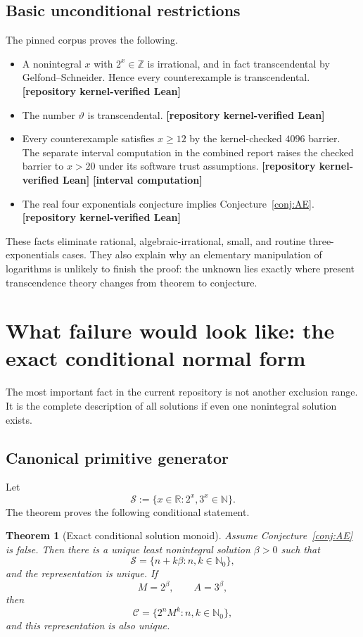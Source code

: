 \documentclass[11pt,oneside]{article}
\newtheorem{theorem}{Theorem}[section]
\theoremstyle{definition}
\theoremstyle{remark}
\newcommand{\N}{\mathbb N}
\newcommand{\Nzero}{\mathbb N_0}
\newcommand{\Z}{\mathbb Z}
\newcommand{\R}{\mathbb R}
\newcommand{\thetaq}{\vartheta}
\newcommand{\Sol}{\mathcal S}
\newcommand{\Cand}{\mathcal C}
\newcommand{\statuslean}{\textcolor{leanblue}{\textbf{[repository kernel-verified Lean]}}}
\newcommand{\statuscomp}{\textcolor{computeviolet}{\textbf{[interval computation]}}}
\begin{document}
\subsection{Basic unconditional restrictions}

The pinned corpus proves the following.

\begin{itemize}
\item A nonintegral $x$ with $2^x\in\Z$ is irrational, and in fact transcendental by
Gelfond--Schneider.  Hence every counterexample is transcendental.  \statuslean
\item The number $\thetaq$ is transcendental.  \statuslean
\item Every counterexample satisfies $x\ge12$ by the kernel-checked $4096$ barrier.
The separate interval computation in the combined report raises the checked barrier to
$x>20$ under its software trust assumptions.  \statuslean{} \statuscomp
\item The real four exponentials conjecture implies Conjecture~\ref{conj:AE}.
\statuslean
\end{itemize}

These facts eliminate rational, algebraic-irrational, small, and routine
three-exponentials cases.  They also explain why an elementary manipulation of logarithms is
unlikely to finish the proof: the unknown lies exactly where present transcendence theory
changes from theorem to conjecture.

\section{What failure would look like: the exact conditional normal form}
\label{sec:conditional}

The most important fact in the current repository is not another exclusion range.  It is the
complete description of all solutions if even one nonintegral solution exists.

\subsection{Canonical primitive generator}

Let
\[
 \Sol:=\{x\in\R:2^x,3^x\in\N\}.
\]
The theorem
proves the following conditional statement.

\begin{theorem}[Exact conditional solution monoid]
\label{thm:exact-monoid}
Assume Conjecture~\ref{conj:AE} is false.  Then there is a unique least nonintegral solution
$\beta>0$ such that
\begin{equation}
  \Sol=\{n+k\beta:n,k\in\Nzero\},
  \label{eq:solution-monoid}
\end{equation}
and the representation is unique.  If
\[
  M=2^\beta,\qquad A=3^\beta,
\]
then
\begin{equation}
  \Cand=\{2^nM^k:n,k\in\Nzero\},
  \label{eq:candidate-monoid}
\end{equation}
and this representation is also unique.
\end{theorem}
\end{document}
